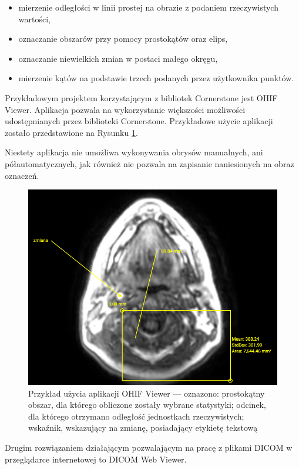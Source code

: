 \documentclass[a4paper,11pt,twoside,openright]{report}
\theoremstyle{definition}
\begin{document}
\begin{itemize}[noitemsep]
\item mierzenie odległości w linii prostej na obrazie z podaniem rzeczywistych wartości,
\item oznaczanie obszarów przy pomocy prostokątów oraz elips,
\item oznaczanie niewielkich zmian w postaci małego okręgu,
\item mierzenie kątów na podstawie trzech podanych przez użytkownika punktów.
\end{itemize}

Przykładowym projektem korzystającym z bibliotek Cornerstone jest OHIF Viewer.
Aplikacja pozwala na wykorzystanie większości możliwości udostępnianych przez
biblioteki Cornerstone. Przykładowe użycie aplikacji zostało przedstawione na
Rysunku \ref{fig:OHIF-example}.

Niestety aplikacja nie umożliwa wykonywania obrysów manualnych, ani półautomatycznych,
jak również nie pozwala na zapisanie naniesionych na obraz oznaczeń.

\begin{figure}[t]
	\includegraphics[width=\textwidth]{OHIF-example}
	\caption{Przykład użycia aplikacji OHIF Viewer --- oznazono: prostokątny obszar,
	dla którego obliczone zostały wybrane statystyki; odcinek, dla którego otrzymano
	odległość jednostkach rzeczywistych; wskaźnik, wskazujący na zmianę, posiadający
	etykietę tekstową}
    	\label{fig:OHIF-example}
\end{figure}

Drugim rozwiązaniem działającym pozwalającym na pracę z plikami DICOM w przeglądarce
internetowej to DICOM Web Viewer.
\end{document}
